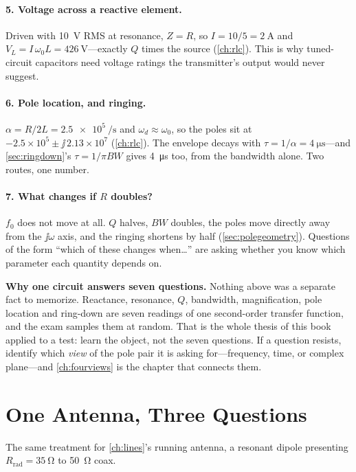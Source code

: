 \paragraph{5. Voltage across a reactive element.}
Driven with \SI{10}{\volt} RMS at resonance, \(Z=R\), so \(I=10/5=\SI{2}{\ampere}\)
and
\(V_L=I\,\omega_0L=\SI{426}{\volt}\)---exactly \(Q\) times the source
(\cref{ch:rlc}). This is why tuned-circuit capacitors need voltage ratings the
transmitter's output would never suggest.

\paragraph{6. Pole location, and ringing.}
\(\alpha=R/2L=\SI{2.5e5}{\per\second}\) and \(\omega_d\approx\omega_0\), so the poles
sit at \(-2.5\times10^5\pm\jj\,2.13\times10^7\) (\cref{ch:rlc}). The envelope decays
with \(\tau=1/\alpha=\SI{4}{\micro\second}\)---and \cref{sec:ringdown}'s
\(\tau=1/\pi BW\) gives \SI{4}{\micro\second} too, from the bandwidth alone. Two
routes, one number.

\paragraph{7. What changes if \(R\) doubles?}
\(f_0\) does not move at all. \(Q\) halves, \(BW\) doubles, the poles move directly
away from the \(\jj\omega\) axis, and the ringing shortens by half
(\cref{sec:polegeometry}). Questions of the form ``which of these changes when\dots''
are asking whether you know which parameter each quantity depends on.

\begin{controlsbox}
\textbf{Why one circuit answers seven questions.} Nothing above was a separate fact to
memorize. Reactance, resonance, \(Q\), bandwidth, magnification, pole location and
ring-down are seven readings of one second-order transfer function, and the exam
samples them at random. That is the whole thesis of this book applied to a test: learn
the object, not the seven questions. If a question resists, identify which \emph{view}
of the pole pair it is asking for---frequency, time, or complex plane---and
\cref{ch:fourviews} is the chapter that connects them.
\end{controlsbox}

\section{One Antenna, Three Questions}
\label{sec:oneantenna}
The same treatment for \cref{ch:lines}'s running antenna, a resonant dipole presenting
\(R_{\text{rad}}=\SI{35}{\ohm}\) to \SI{50}{\ohm} coax.

